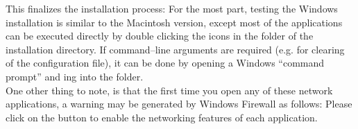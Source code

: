 \newpage



\newpage
This finalizes the installation process:
\newpage
{}
For the most part, testing the Windows installation is similar to the Macintosh version,
except most of the applications can be executed directly by double clicking the icons in
the  folder of the installation directory.
If command--line arguments are required (e.g. for clearing of the \yarp{} configuration
file), it can be done by opening a Windows ``command prompt'' and ing into
the  folder.\\

One other thing to note, is that the first time you open any of these network
applications, a warning may be generated by Windows Firewall as follows:
Please click on the  button to enable the networking features of
each application.
\tertiaryEnd{}
\secondaryEnd{}
\primaryEnd{}
